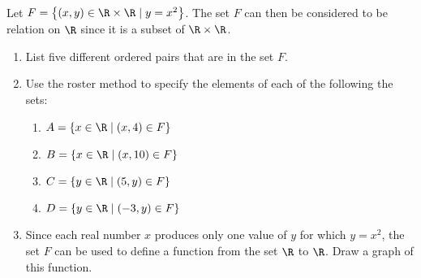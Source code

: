 \begin{prog}\label{prog:setofpairs} \hfill \\
Let $F = \left\{ (x, y) \in \R \times \R \mid y = x^2 \right\}$.  The set $F$ can then be considered to be relation on $\R$ since it is a subset of $\R \times \R$.

\begin{enumerate}
\item List five different ordered pairs that are in the set $F$.

\item Use the roster method to specify the elements of each of the following the sets:
\begin{multicols}{2}
\begin{enumerate}
\item $A = \left\{ x \in \R \mid (x, 4) \in F \right\}$
\item $B = \left\{ x \in \R \mid (x, 10) \in F \right\}$
\item $C = \left\{ y \in \R \mid (5, y) \in F \right\}$
\item $D = \left\{ y \in \R \mid (-3, y) \in F \right\}$
\end{enumerate}
\end{multicols}

\item Since each real number $x$ produces only one value of $y$ for which $y = x^2$, the set  $F$  can be used to define a function from the set  $\R$  to $\R$.  Draw a graph of this function.
\end{enumerate}
\end{prog}
\hbreak

\endinput
